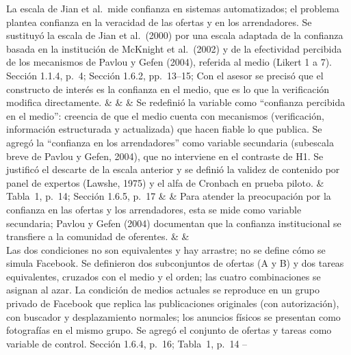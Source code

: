 \documentclass[10pt]{article}
\newcommand{\continuacion}[4]{ & & & #2 & #3 & \cellcolor{#1} & #4 & & \\}
\begin{document}
\begin{matriz}
  {La escala de Jian et al.\ mide confianza en sistemas automatizados; el problema plantea confianza en la veracidad de las ofertas y en los arrendadores.}
  {Se sustituyó la escala de Jian et al.\ (2000) por una escala adaptada de la confianza basada en la institución de McKnight et al.\ (2002) y de la efectividad percibida de los mecanismos de Pavlou y Gefen (2004), referida al medio (Likert 1 a 7).}
  {Sección 1.1.4, p.~4; Sección 1.6.2, pp.~13--15;}
  {\Atendida}
  {Con el asesor se precisó que el constructo de interés es la confianza en el medio, que es lo que la verificación modifica directamente.}
  {}
\continuacion{edoAtendida}
  {Se redefinió la variable como ``confianza percibida en el medio'': creencia de que el medio cuenta con mecanismos (verificación, información estructurada y actualizada) que hacen fiable lo que publica.\newline
   Se agregó la ``confianza en los arrendadores'' como variable secundaria (subescala breve de Pavlou y Gefen, 2004), que no interviene en el contraste de H1.\newline
   Se justificó el descarte de la escala anterior y se definió la validez de contenido por panel de expertos (Lawshe, 1975) y el alfa de Cronbach en prueba piloto.}
  {Tabla~1, p.~14; Sección 1.6.5, p.~17}
  {Para atender la preocupación por la confianza en las ofertas y los arrendadores, esta se mide como variable secundaria; Pavlou y Gefen (2004) documentan que la confianza institucional se transfiere a la comunidad de oferentes.}

  {Las dos condiciones no son equivalentes y hay arrastre; no se define cómo se simula Facebook.}
  {Se definieron dos subconjuntos de ofertas (A y B) y dos tareas equivalentes, cruzados con el medio y el orden; las cuatro combinaciones se asignan al azar.\newline
   La condición de medios actuales se reproduce en un grupo privado de Facebook que replica las publicaciones originales (con autorización), con buscador y desplazamiento normales; los anuncios físicos se presentan como fotografías en el mismo grupo.\newline
   Se agregó el conjunto de ofertas y tareas como variable de control.}
  {Sección 1.6.4, p.~16; Tabla~1, p.~14}
  {\Atendida}{--}{}


\end{matriz}
\end{document}
